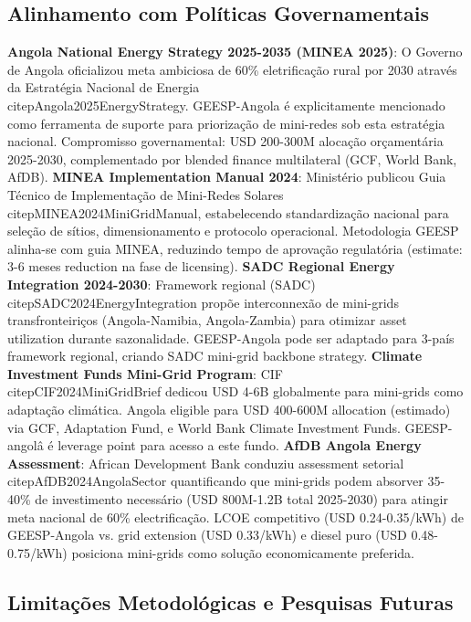 \documentclass[12pt, a4paper]{article}
\begin{document}
\subsection{Alinhamento com Políticas Governamentais}
\textbf{Angola National Energy Strategy 2025-2035 (MINEA 2025)}: O Governo de Angola oficializou meta ambiciosa de 60\% eletrificação rural por 2030 através da Estratégia Nacional de Energia~\\citep{Angola2025EnergyStrategy}. GEESP-Angola é explicitamente mencionado como ferramenta de suporte para priorização de mini-redes sob esta estratégia nacional. Compromisso governamental: USD 200-300M alocação orçamentária 2025-2030, complementado por blended finance multilateral (GCF, World Bank, AfDB).
\textbf{MINEA Implementation Manual 2024}: Ministério publicou Guia Técnico de Implementação de Mini-Redes Solares~\\citep{MINEA2024MiniGridManual}, estabelecendo standardização nacional para seleção de sítios, dimensionamento e protocolo operacional. Metodologia GEESP alinha-se com guia MINEA, reduzindo tempo de aprovação regulatória (estimate: 3-6 meses reduction na fase de licensing).
\textbf{SADC Regional Energy Integration 2024-2030}: Framework regional (SADC)~\\citep{SADC2024EnergyIntegration} propõe interconnexão de mini-grids transfronteiriços (Angola-Namibia, Angola-Zambia) para otimizar asset utilization durante sazonalidade. GEESP-Angola pode ser adaptado para 3-país framework regional, criando SADC mini-grid backbone strategy.
\textbf{Climate Investment Funds Mini-Grid Program}: CIF~\\citep{CIF2024MiniGridBrief} dedicou USD 4-6B globalmente para mini-grids como adaptação climática. Angola eligible para USD 400-600M allocation (estimado) via GCF, Adaptation Fund, e World Bank Climate Investment Funds. GEESP-angolâ é leverage point para acesso a este fundo.
\textbf{AfDB Angola Energy Assessment}: African Development Bank conduziu assessment setorial~\\citep{AfDB2024AngolaSector} quantificando que mini-grids podem absorver 35-40\% de investimento necessário (USD 800M-1.2B total 2025-2030) para atingir meta nacional de 60\% electrificação. LCOE competitivo (USD 0.24-0.35/kWh) de GEESP-Angola vs. grid extension (USD 0.33/kWh) e diesel puro (USD 0.48-0.75/kWh) posiciona mini-grids como solução economicamente preferida.

\subsection{Limitações Metodológicas e Pesquisas Futuras}
\end{document}
